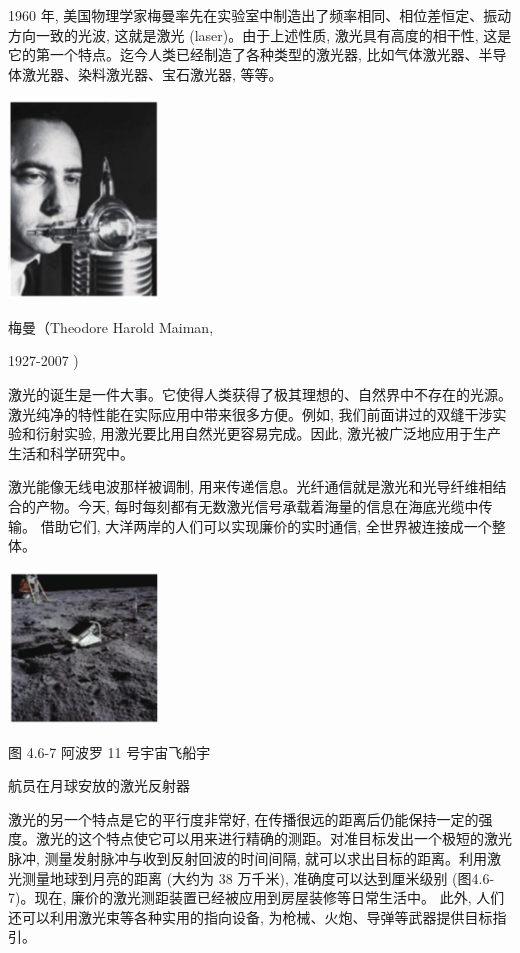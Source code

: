 \documentclass[10pt]{article}
\begin{document}
1960 年, 美国物理学家梅曼率先在实验室中制造出了频率相同、相位差恒定、振动方向一致的光波, 这就是激光 (laser)。由于上述性质, 激光具有高度的相干性, 这是它的第一个特点。迄今人类已经制造了各种类型的激光器, 比如气体激光器、半导体激光器、染料激光器、宝石激光器, 等等。

\begin{center}
\includegraphics[max width=0.3\textwidth]{images/01910e4c-ebb8-7d2c-8f2f-2375bc1d2d12_116_555542.jpg}
\end{center}

梅曼（Theodore Harold Maiman,

1927-2007 )

激光的诞生是一件大事。它使得人类获得了极其理想的、自然界中不存在的光源。激光纯净的特性能在实际应用中带来很多方便。例如, 我们前面讲过的双缝干涉实验和衍射实验, 用激光要比用自然光更容易完成。因此, 激光被广泛地应用于生产生活和科学研究中。

激光能像无线电波那样被调制, 用来传递信息。光纤通信就是激光和光导纤维相结合的产物。今天, 每时每刻都有无数激光信号承载着海量的信息在海底光缆中传输。 借助它们, 大洋两岸的人们可以实现廉价的实时通信, 全世界被连接成一个整体。

\begin{center}
\includegraphics[max width=0.3\textwidth]{images/01910e4c-ebb8-7d2c-8f2f-2375bc1d2d12_117_562669.jpg}
\end{center}

图 4.6-7 阿波罗 11 号宇宙飞船宇

航员在月球安放的激光反射器

激光的另一个特点是它的平行度非常好, 在传播很远的距离后仍能保持一定的强度。激光的这个特点使它可以用来进行精确的测距。对准目标发出一个极短的激光脉冲, 测量发射脉冲与收到反射回波的时间间隔, 就可以求出目标的距离。利用激光测量地球到月亮的距离 (大约为 38 万千米), 准确度可以达到厘米级别 (图4.6-7)。现在, 廉价的激光测距装置已经被应用到房屋装修等日常生活中。 此外, 人们还可以利用激光束等各种实用的指向设备, 为枪械、火炮、导弹等武器提供目标指引。
\end{document}
